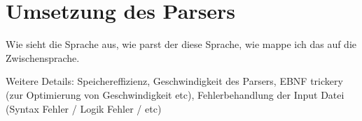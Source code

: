 \chapter{Umsetzung des Parsers}
\label{chap:building:parser}

Wie sieht die Sprache aus, wie parst der diese Sprache, wie mappe ich das auf die Zwischensprache.

Weitere Details: Speichereffizienz, Geschwindigkeit des Parsers, EBNF trickery (zur Optimierung von Geschwindigkeit etc), Fehlerbehandlung der Input Datei (Syntax Fehler / Logik Fehler / etc)
